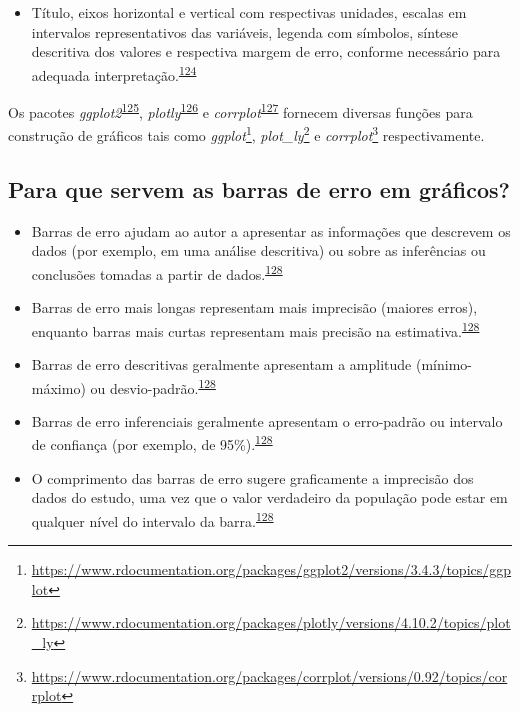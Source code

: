 \documentclass[
]{book}
\providecommand{\tightlist}{%
  \setlength{\itemsep}{0pt}\setlength{\parskip}{0pt}}
\renewcommand{\href}[2]{#2\footnote{\url{#1}}}
\newenvironment{infobox}[1]
  {
  \begin{itemize}
  \renewcommand{\labelitemi}{
    \raisebox{-.7\height}[0pt][0pt]{
      {\setkeys{Gin}{width=3em,keepaspectratio}
        \texttt{[image: \#1]}}
    }
  }
  \setlength{\fboxsep}{1em}
  \begin{blackbox}
  \item
  }
  {
  \end{blackbox}
  \end{itemize}
  }
\begin{document}
\begin{itemize}
\tightlist
\item
  Título, eixos horizontal e vertical com respectivas unidades, escalas em intervalos representativos das variáveis, legenda com símbolos, síntese descritiva dos valores e respectiva margem de erro, conforme necessário para adequada interpretação.\textsuperscript{\protect\hyperlink{ref-Park2022}{124}}
\end{itemize}

\begin{infobox}{images/Rlogo}
Os pacotes \emph{ggplot2}\textsuperscript{\protect\hyperlink{ref-ggplot2}{125}}, \emph{plotly}\textsuperscript{\protect\hyperlink{ref-plotly}{126}} e \emph{corrplot}\textsuperscript{\protect\hyperlink{ref-corrplot}{127}} fornecem diversas funções para construção de gráficos tais como \href{https://www.rdocumentation.org/packages/ggplot2/versions/3.4.3/topics/ggplot}{\emph{ggplot}}, \href{https://www.rdocumentation.org/packages/plotly/versions/4.10.2/topics/plot_ly}{\emph{plot\_ly}} e \href{https://www.rdocumentation.org/packages/corrplot/versions/0.92/topics/corrplot}{\emph{corrplot}} respectivamente.

\end{infobox}

\hypertarget{para-que-servem-as-barras-de-erro-em-gruxe1ficos}{%
\subsection{Para que servem as barras de erro em gráficos?}\label{para-que-servem-as-barras-de-erro-em-gruxe1ficos}}

\begin{itemize}
\item
  Barras de erro ajudam ao autor a apresentar as informações que descrevem os dados (por exemplo, em uma análise descritiva) ou sobre as inferências ou conclusões tomadas a partir de dados.\textsuperscript{\protect\hyperlink{ref-Cumming2007}{128}}
\item
  Barras de erro mais longas representam mais imprecisão (maiores erros), enquanto barras mais curtas representam mais precisão na estimativa.\textsuperscript{\protect\hyperlink{ref-Cumming2007}{128}}
\item
  Barras de erro descritivas geralmente apresentam a amplitude (mínimo-máximo) ou desvio-padrão.\textsuperscript{\protect\hyperlink{ref-Cumming2007}{128}}
\item
  Barras de erro inferenciais geralmente apresentam o erro-padrão ou intervalo de confiança (por exemplo, de 95\%).\textsuperscript{\protect\hyperlink{ref-Cumming2007}{128}}
\item
  O comprimento das barras de erro sugere graficamente a imprecisão dos dados do estudo, uma vez que o valor verdadeiro da população pode estar em qualquer nível do intervalo da barra.\textsuperscript{\protect\hyperlink{ref-Cumming2007}{128}}
\end{itemize}
\end{document}
